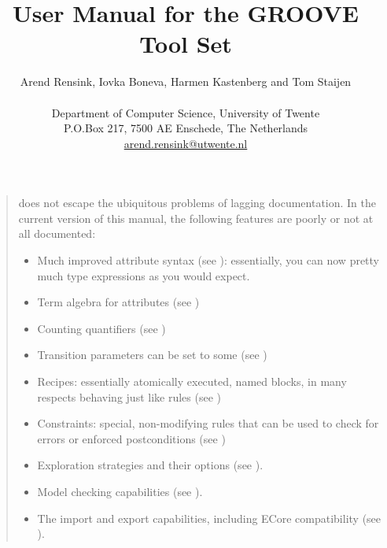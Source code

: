 \title{User Manual for the GROOVE Tool Set}
\author{Arend Rensink, Iovka Boneva, Harmen Kastenberg and Tom Staijen \\
%
\vspace{0.2in} \\
%
Department of Computer Science, University of Twente \\
P.O.Box 217, 7500 AE Enschede, The Netherlands \\
\url{arend.rensink@utwente.nl}
}
\maketitle
%
\vspace{0.2in}

\clearpage
\tableofcontents

\begin{quote}
  \GROOVE does not escape the ubiquitous problems of lagging documentation. In
  the current version of this manual, the following features are poorly or not
  at all documented:
\begin{itemize}[noitemsep]
\item Much improved attribute syntax (see ): essentially, you can now pretty much type expressions as you would expect.
\item Term algebra for attributes (see )
\item Counting quantifiers (see )
\item Transition parameters can be set to \textsf{some} (see )
\item Recipes: essentially atomically executed, named blocks, in many respects behaving just like rules (see )
\item Constraints: special, non-modifying rules that can be used to check for errors or enforced postconditions (see )
\item Exploration strategies and their options (see ). 
\item Model checking capabilities (see ). 
\item The import and export capabilities, including ECore compatibility (see ).
\end{itemize}
\end{quote}

